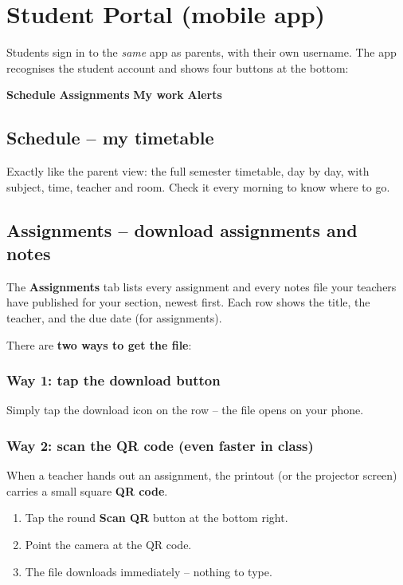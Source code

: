 \chapter{Student Portal (mobile app)}

Students sign in to the \emph{same} app as parents, with their own
username. The app recognises the student account and shows four buttons
at the bottom:

\begin{center}
\textbf{Schedule} \quad \textbf{Assignments} \quad \textbf{My work}
\quad \textbf{Alerts}
\end{center}

\section{Schedule -- my timetable}

Exactly like the parent view: the full semester timetable, day by day,
with subject, time, teacher and room. Check it every morning to know
where to go.

\section{Assignments -- download assignments and notes}

The \textbf{Assignments} tab lists every assignment and every notes
file your teachers have published for your section, newest first. Each
row shows the title, the teacher, and the due date (for assignments).

There are \textbf{two ways to get the file}:

\subsection{Way 1: tap the download button}
Simply tap the download icon on the row -- the file opens on your
phone.

\subsection{Way 2: scan the QR code (even faster in class)}
When a teacher hands out an assignment, the printout (or the projector
screen) carries a small square \textbf{QR code}.

\begin{enumerate}[itemsep=2pt]
  \item Tap the round \textbf{Scan QR} button at the bottom right.
  \item Point the camera at the QR code.
  \item The file downloads immediately -- nothing to type.
\end{enumerate}

